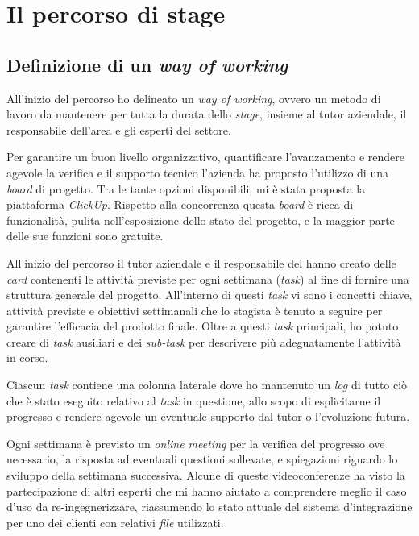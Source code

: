 \chapter{Il percorso di stage}


\section{Definizione di un \textit{way of working}}

All'inizio del percorso ho delineato un \textit{way of working}, ovvero un metodo di lavoro da mantenere per tutta la durata dello \textit{stage}, insieme al tutor aziendale, il responsabile dell'area  e gli esperti del settore.

Per garantire un buon livello organizzativo, quantificare l'avanzamento e rendere agevole la verifica e il supporto tecnico l'azienda ha proposto l'utilizzo di una \textit{board} di progetto.
Tra le tante opzioni disponibili, mi è stata proposta la piattaforma \textit{ClickUp}.
Rispetto alla concorrenza questa \textit{board} è ricca di funzionalità, pulita nell'esposizione dello stato del progetto, e la maggior parte delle sue funzioni sono gratuite.

All'inizio del percorso il tutor aziendale e il responsabile del  hanno creato delle \textit{card} contenenti le attività previste per ogni settimana (\textit{task}) al fine di fornire una struttura generale del progetto.
All'interno di questi \textit{task} vi sono i concetti chiave, attività previste e obiettivi settimanali che lo stagista è tenuto a seguire per garantire l'efficacia del prodotto finale.
Oltre a questi \textit{task} principali, ho potuto creare di \textit{task} ausiliari e dei \textit{sub-task} per descrivere più adeguatamente l'attività in corso.

Ciascun \textit{task} contiene una colonna laterale dove ho mantenuto un \textit{log} di tutto ciò che è stato eseguito relativo al \textit{task} in questione, allo scopo di esplicitarne il progresso e rendere agevole un eventuale supporto dal tutor o l'evoluzione futura.

Ogni settimana è previsto un \textit{online meeting} per la verifica del progresso ove necessario, la risposta ad eventuali questioni sollevate, e spiegazioni riguardo lo sviluppo della settimana successiva.
Alcune di queste videoconferenze ha visto la partecipazione di altri esperti che mi hanno aiutato a comprendere meglio il caso d'uso da re-ingegnerizzare, riassumendo lo stato attuale del sistema d'integrazione per uno dei clienti con relativi \textit{file} utilizzati.

